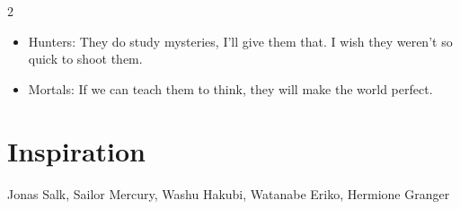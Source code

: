 \begin{multicols}{2}
\begin{itemize}
\item Hunters: They do study mysteries, I'll give them that. I wish they weren't so quick to shoot them.
\item Mortals: If we can teach them to think, they will make the world perfect.
\end{itemize}

\section*{Inspiration}
Jonas Salk, Sailor Mercury, Washu Hakubi, Watanabe Eriko, Hermione Granger

\end{multicols}
